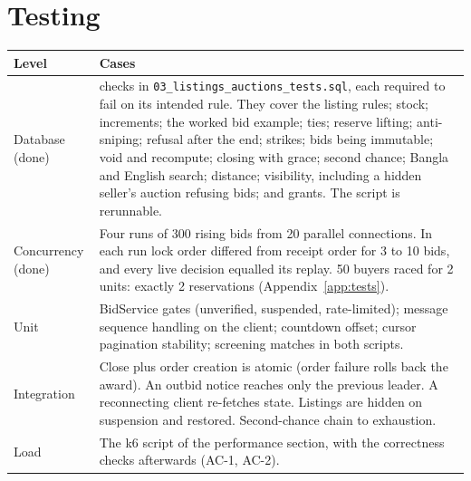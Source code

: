 \documentclass[11pt,a4paper]{article}
\newenvironment{dtable}[1]{\small\begin{longtable}{#1}}{\end{longtable}}
\begin{document}
\section{Testing}
\begin{dtable}{@{}>{\raggedright\arraybackslash}p{3.2cm}>{\raggedright\arraybackslash}p{12cm}@{}}
\toprule
\textbf{Level} & \textbf{Cases} \\ \midrule \endhead
Database (done) & 67 checks in \texttt{03\_listings\_auctions\_tests.sql}, each required to fail on its intended rule. They cover the listing rules; stock; increments; the worked bid example; ties; reserve lifting; anti-sniping; refusal after the end; strikes; bids being immutable; void and recompute; closing with grace; second chance; Bangla and English search; distance; visibility, including a hidden seller's auction refusing bids; and grants. The script is rerunnable. \\
Concurrency (done) & Four runs of 300 rising bids from 20 parallel connections. In each run lock order differed from receipt order for 3 to 10 bids, and every live decision equalled its replay. 50 buyers raced for 2 units: exactly 2 reservations (Appendix~\ref{app:tests}). \\
Unit & BidService gates (unverified, suspended, rate-limited); message sequence handling on the client; countdown offset; cursor pagination stability; screening matches in both scripts. \\
Integration & Close plus order creation is atomic (order failure rolls back the award). An outbid notice reaches only the previous leader. A reconnecting client re-fetches state. Listings are hidden on suspension and restored. Second-chance chain to exhaustion. \\
Load & The k6 script of the performance section, with the correctness checks afterwards (AC-1, AC-2). \\
\bottomrule
\end{dtable}
\end{document}
